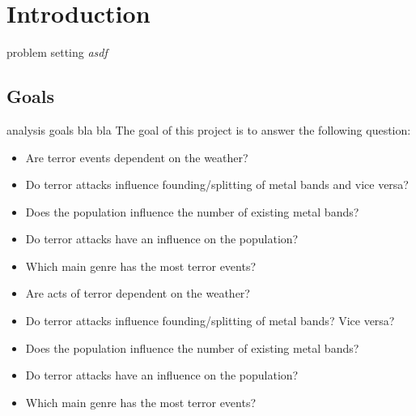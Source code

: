 
\section{Introduction}


problem setting
\emph{asdf}




\subsection{Goals}
analysis goals bla bla
The goal of this project is to answer the following question:
	\begin{itemize}
		\item Are terror events dependent on the weather?
		\item Do terror attacks influence founding/splitting of metal bands and vice versa?
		\item Does the population influence the number of existing metal bands?
		\item Do terror attacks have an influence on the population?
		\item Which main genre has the most terror events?
	\end{itemize}

\begin{itemize}
	\item Are acts of terror dependent on the weather?
	\item Do terror attacks influence founding/splitting of metal bands? Vice versa?
	\item Does the population influence the number of existing metal bands?
	\item Do terror attacks have an influence on the population?
	\item Which main genre has the most terror events?
\end{itemize}




